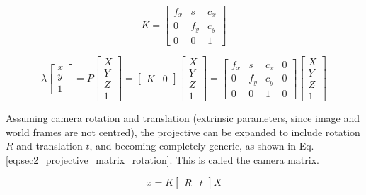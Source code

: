 \begin{equation}
    \label{eq:sec2_instrinsic_matrix}
    K=\begin{bmatrix}
        f_x & s & c_x\\
        0 & f_y & c_y\\
        0 & 0 & 1
    \end{bmatrix}
\end{equation}

\begin{equation}
    \label{eq:sec2_projective_matrix}
    \lambda \begin{bmatrix}
        x\\
        y\\
        1
    \end{bmatrix}=
    P
    \begin{bmatrix}
        X\\
        Y\\
        Z\\
        1
    \end{bmatrix}
    =
    \begin{bmatrix}
        K & 0
    \end{bmatrix}
    \begin{bmatrix}
        X\\
        Y\\
        Z\\
        1
    \end{bmatrix}
    =
    \begin{bmatrix}
        f_x & s & c_x & 0\\
        0 & f_y & c_y & 0\\
        0 & 0 & 1 & 0
    \end{bmatrix}
    \begin{bmatrix}
        X\\
        Y\\
        Z\\
        1
    \end{bmatrix}
\end{equation}

Assuming camera rotation and translation (extrinsic parameters, since image and world frames are not centred), the projective can be expanded to include rotation $R$ and translation $t$, and becoming completely generic, as shown in Eq.\,\eqref{eq:sec2_projective_matrix_rotation}. This is called the camera matrix.

\begin{equation}
    \label{eq:sec2_projective_matrix_rotation}
    x = K \begin{bmatrix}
        R & t
    \end{bmatrix}
    X
\end{equation}

